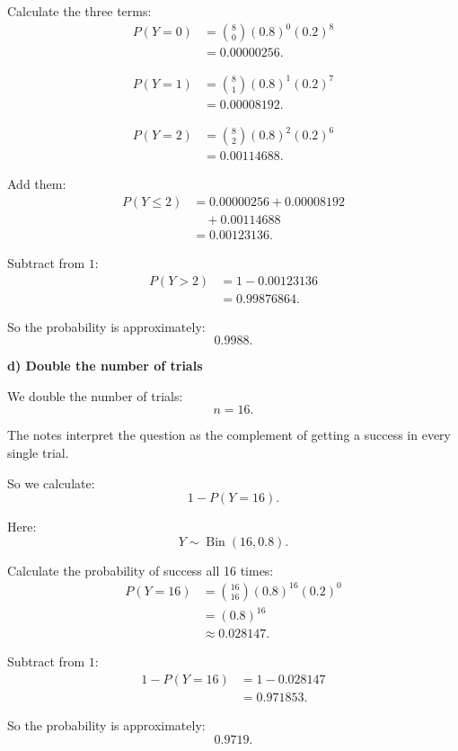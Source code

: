 \documentclass[10pt]{article}
\begin{document}
Calculate the three terms:
\begin{align*}
P(Y=0)
&=
\binom{8}{0}
(0.8)^0(0.2)^8
\\[2mm]
&=
0.00000256.
\end{align*}

\begin{align*}
P(Y=1)
&=
\binom{8}{1}
(0.8)^1(0.2)^7
\\[2mm]
&=
0.00008192.
\end{align*}

\begin{align*}
P(Y=2)
&=
\binom{8}{2}
(0.8)^2(0.2)^6
\\[2mm]
&=
0.00114688.
\end{align*}

Add them:
\begin{align*}
P(Y\le 2)
&=
0.00000256
+0.00008192
\\
&\quad
+0.00114688
\\[2mm]
&=
0.00123136.
\end{align*}

Subtract from \(1\):
\begin{align*}
P(Y>2)
&=
1-0.00123136
\\[2mm]
&=
0.99876864.
\end{align*}

So the probability is approximately:
\[
0.9988.
\]

\textbf{d) Double the number of trials}

We double the number of trials:
\[
n=16.
\]

The notes interpret the question as the complement
of getting a success in every single trial.

So we calculate:
\[
1-P(Y=16).
\]

Here:
\[
Y\sim \operatorname{Bin}(16,0.8).
\]

Calculate the probability of success all 16 times:
\begin{align*}
P(Y=16)
&=
\binom{16}{16}
(0.8)^{16}(0.2)^0
\\[2mm]
&=
(0.8)^{16}
\\[2mm]
&\approx
0.028147.
\end{align*}

Subtract from \(1\):
\begin{align*}
1-P(Y=16)
&=
1-0.028147
\\[2mm]
&=
0.971853.
\end{align*}

So the probability is approximately:
\[
0.9719.
\]
\end{document}
